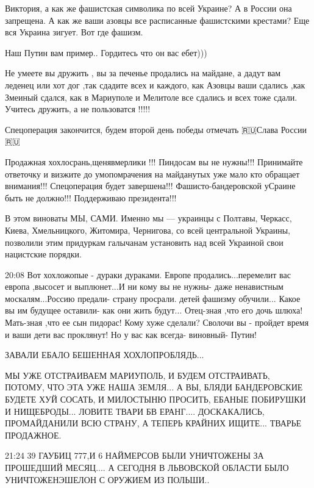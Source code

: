 Виктория, а как же фашистская символика по всей Украине? А в России она
запрещена. А как же ваши азовцы все расписанные фашистскими крестами? Еще вся
Украина зигует. Вот где фашизм.

Наш Путин вам пример.. Гордитесь что он вас ебет)))

Не умеете вы дружить , вы за печенье продались на майдане, а дадут вам леденец
или хот дог ,так сдадите всех и каждого, как Азовцы ваши сдались ,как Змеиный
сдался, как в Мариуполе и Мелитоле все сдались и всех тоже сдали. Учитесь
дружить, а не пользоватся !!!!!

Спецоперация закончится, будем второй день победы отмечать
🇷🇺Слава России🇷🇺

Продажная хохлосрань,щенявмерлики !!! Пиндосам вы не нужны!!! Принимайте
ответочку и визжите до умопомрачения на майданутых уже мало кто обращает
внимания!!! Спецоперация будет завершена!!! Фашисто-бандеровской уСраине быть
не должно!!! Поддерживаю президента!!!

В этом виноваты МЫ, САМИ. Именно мы — украинцы с Полтавы, Черкасс, Киева,
Хмельницкого, Житомира, Чернигова, со всей центральной Украины, позволили этим
придуркам галычанам установить над всей Украиной свои нацистские порядки.

20:08
Вот хохложопые - дураки дураками. Европе продались...перемелит вас европа
,высосет и выплюнет...И ни кому вы не нужны- даже ненавистным москалям...Россию
предали- страну просрали. детей фашизму обучили... Какое вы им будущее
оставили- как они жить будут... Отец-зная ,что его дочь шлюха! Мать-зная ,что
ее сын пидорас! Кому хуже сделали? Сволочи вы - пройдет время и ваши дети вас
проклянут! Но у вас как всегда- виновный- Путин!

ЗАВАЛИ ЕБАЛО БЕШЕННАЯ ХОХЛОПРОБЛЯДЬ...

МЫ УЖЕ ОТСТРАИВАЕМ МАРИУПОЛЬ, И БУДЕМ ОТСТРАИВАТЬ, ПОТОМУ, ЧТО ЭТА УЖЕ НАША
ЗЕМЛЯ... А ВЫ, БЛЯДИ БАНДЕРОВСКИЕ БУДЕТЕ ХУЙ СОСАТЬ, И МИЛОСТЫНЮ ПРОСИТЬ,
ЕБАНЫЕ ПОБИРУШКИ И НИЩЕБРОДЫ... ЛОВИТЕ ТВАРИ БВ ЕРАНГ.... ДОСКАКАЛИСЬ,
ПРОМАЙДАНИЛИ ВСЮ СТРАНУ, А ТЕПЕРЬ КРАЙНИХ ИЩИТЕ... ТВАРЬЕ ПРОДАЖНОЕ.

21:24
39 ГАУБИЦ 777,И 6 НАЙМЕРСОВ БЫЛИ УНИЧТОЖЕНЫ ЗА ПРОШЕДШИЙ МЕСЯЦ.... А СЕГОДНЯ В
ЛЬВОВСКОЙ ОБЛАСТИ БЫЛО УНИЧТОЖЕНЭШЕЛОН С ОРУЖИЕМ ИЗ ПОЛЬШИ..

